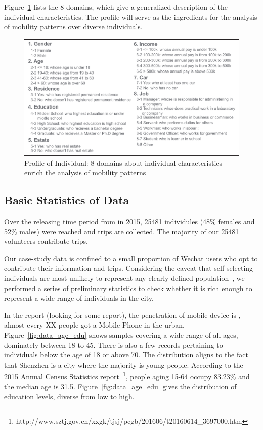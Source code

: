 Figure~\ref{fig:data_over} lists the 8 domains, which give a generalized description of the individual characteristics. The profile will serve as the ingredients for the analysis of mobility patterns over diverse individuals. 

\begin{figure}[htb!]
 \centering %
 \includegraphics[width=\columnwidth]{pictures/data_over}
 \caption{Profile of Individual: 8 domains about individual characteristics enrich the analysis of mobility patterns}
 \label{fig:data_over}
\end{figure}

\subsection{Basic Statistics of Data}

Over the releasing time period from  in 2015, 25481 individules (48\% females and 52\% males) were reached and  trips are collected. The majority of our 25481 volunteers contribute  trips. 

Our case-study data is confined to a small proportion of Wechat users who opt to contribute their information and trips.
Considering the caveat that self-selecting individuals are most unlikely to represent any clearly defined population~\cite{Longley2015}, we performed a series of preliminary statistics to check whether it is rich enough to represent a wide range of individuals in the city. 


In the report (looking for some report), the penetration of mobile device is , almost every XX people got a Mobile Phone in the urban. Figure~\ref{fig:data_age_edu} shows samples covering a wide range of all ages, dominately between 18 to 45. There is also a few records pertaining to individuals below the age of 18 or above 70. The distribution aligns to the fact that Shenzhen is a city where the majority is young people. According to the 2015 Annual Census Statistics report~\footnote{http://www.sztj.gov.cn/xxgk/tjsj/pcgb/201606/t20160614\_3697000.htm}, people aging 15-64 occupy 83.23\% and the median age is 31.5. Figure~\ref{fig:data_age_edu} gives the distribution of education levels, diverse from low to high. 

